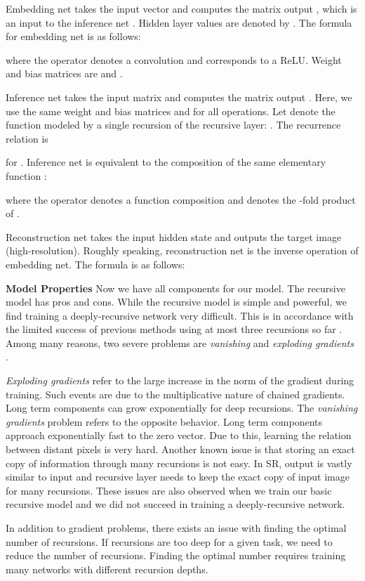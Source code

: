 \documentclass[10pt,twocolumn,letterpaper]{article}
\begin{document}
 Embedding net  takes the input vector  and computes the matrix output , which is an input to the inference net . Hidden layer values are denoted by . The formula for embedding net is as follows:
  
where the operator  denotes a convolution and  corresponds to a ReLU. Weight and bias matrices are  and .

Inference net  takes the input matrix  and computes the matrix output . Here, we use the same weight and bias matrices  and  for all operations.  Let  denote the function modeled by a single recursion of the recursive layer: . The recurrence relation is  

for . 
Inference net  is equivalent to the composition of the same elementary function : 

where the operator  denotes a function composition and  denotes the -fold product of .

Reconstruction net  takes the input hidden state  and outputs the target image (high-resolution). Roughly speaking, reconstruction net is the inverse operation of embedding net. The formula is as follows:


\textbf{Model Properties} Now we have all components for our model. The recursive model has pros and cons. While the recursive model is simple and powerful, we find training a deeply-recursive network very difficult. This is in accordance with the limited success of previous methods using at most three recursions so far \cite{Liang_2015_CVPR}.  Among many reasons, two severe problems are \textit{vanishing} and \textit{exploding gradients} \cite{bengio1994learning, pascanu2013difficulty}.  

\textit{Exploding gradients} refer to the large increase in the norm
of the gradient during training. Such events are due to
the multiplicative nature of chained gradients. Long term components can grow exponentially for deep recursions. The
\textit{vanishing gradients} problem refers to the opposite behavior. Long term components approach exponentially
fast to the zero vector. Due to this, learning the relation between distant pixels is very hard. Another known issue is that storing an exact copy of information through many recursions is not easy. In SR, output is vastly similar to input and recursive layer needs to keep the exact copy of input image for many recursions. These issues are also observed when we train our basic recursive model and we did not succeed in training a deeply-recursive network. 

In addition to gradient problems, there exists an issue with finding the optimal number of recursions. If recursions are too deep for a given task, we need to reduce the number of recursions. Finding the optimal number requires training many networks with different recursion depths.   
\end{document}
